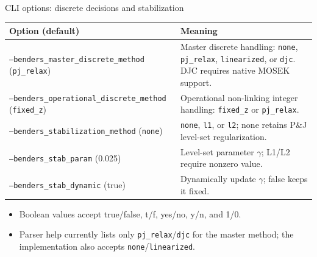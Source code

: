 \documentclass[aspectratio=169,10pt]{beamer}
\begin{document}
\begin{frame}{CLI options: discrete decisions and stabilization}
\scriptsize
\begin{tabular}{@{}p{}p{}@{}}
\toprule Option (default) & Meaning \\
\midrule
\texttt{--benders\_master\_discrete\_method} (\texttt{pj\_relax}) & Master discrete handling: \texttt{none}, \texttt{pj\_relax}, \texttt{linearized}, or \texttt{djc}. DJC requires native MOSEK support.\\
\texttt{--benders\_operational\_discrete\_method} (\texttt{fixed\_z}) & Operational non-linking integer handling: \texttt{fixed\_z} or \texttt{pj\_relax}.\\
\texttt{--benders\_stabilization\_method} (\texttt{none}) & \texttt{none}, \texttt{l1}, or \texttt{l2}; none retains P\&J level-set regularization.\\
\texttt{--benders\_stab\_param} (0.025) & Level-set parameter $\gamma$; L1/L2 require nonzero value.\\
\texttt{--benders\_stab\_dynamic} (true) & Dynamically update $\gamma$; false keeps it fixed.\\
\bottomrule
\end{tabular}
\vspace{1mm}
\begin{itemize}
\item Boolean values accept true/false, t/f, yes/no, y/n, and 1/0.
\item Parser help currently lists only \texttt{pj\_relax}/\texttt{djc} for the master method; the implementation also accepts \texttt{none}/\texttt{linearized}.
\end{itemize}
\end{frame}
\end{document}

